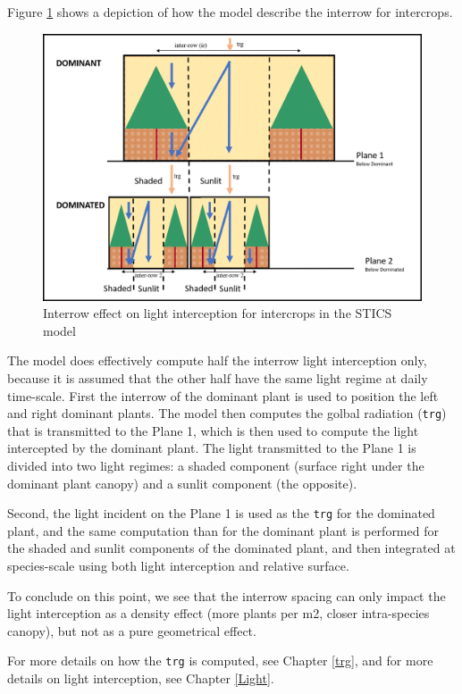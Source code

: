 \documentclass[
]{book}
\begin{document}
Figure \ref{fig:interrow} shows a depiction of how the model describe the interrow for intercrops.

\begin{figure}
\centering
\includegraphics{img/Interrow.png}
\caption{\label{fig:interrow}Interrow effect on light interception for intercrops in the STICS model}
\end{figure}

The model does effectively compute half the interrow light interception only, because it is assumed that the other half have the same light regime at daily time-scale.
First the interrow of the dominant plant is used to position the left and right dominant plants. The model then computes the golbal radiation (\texttt{trg}) that is transmitted to the Plane 1, which is then used to compute the light intercepted by the dominant plant. The light transmitted to the Plane 1 is divided into two light regimes: a shaded component (surface right under the dominant plant canopy) and a sunlit component (the opposite).

Second, the light incident on the Plane 1 is used as the \texttt{trg} for the dominated plant, and the same computation than for the dominant plant is performed for the shaded and sunlit components of the dominated plant, and then integrated at species-scale using both light interception and relative surface.

To conclude on this point, we see that the interrow spacing can only impact the light interception as a density effect (more plants per m2, closer intra-species canopy), but not as a pure geometrical effect.

For more details on how the \texttt{trg} is computed, see Chapter \ref{trg}, and for more details on light interception, see Chapter \ref{Light}.
\end{document}
